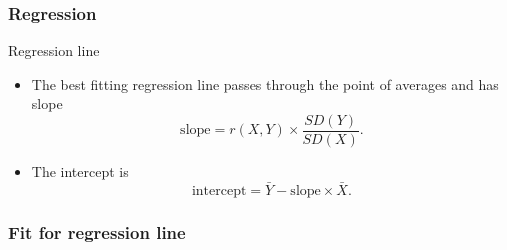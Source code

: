 \documentclass[handout]{beamer}
\begin{document}

   \begin{frame} \frametitle{Regression}

   \begin{block}
   {Regression line}
   \begin{itemize}
   \item    The best fitting regression line
   passes through
   the point of averages and has slope
   $$
   \text{slope} = r(X,Y) \times \frac{SD(Y)}{SD(X)}.
   $$
   \item The intercept is
   $$
   \text{intercept} = \bar{Y} - \text{slope} \times \bar{X}.
   $$
   \end{itemize}

   \end{block}
   \end{frame}



   \begin{frame}
   \frametitle{Fit for regression line}
   \begin{center}
   \end{center}

   \end{frame}
\end{document}
